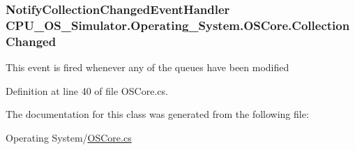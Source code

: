 \subsubsection[{Collection\+Changed}]{\setlength{\rightskip}{0pt plus 5cm}Notify\+Collection\+Changed\+Event\+Handler C\+P\+U\+\_\+\+O\+S\+\_\+\+Simulator.\+Operating\+\_\+\+System.\+O\+S\+Core.\+Collection\+Changed}\label{class_c_p_u___o_s___simulator_1_1_operating___system_1_1_o_s_core_abcbb2efff8a4078fae3edb9b31f62198}


This event is fired whenever any of the queues have been modified 



Definition at line 40 of file O\+S\+Core.\+cs.



The documentation for this class was generated from the following file\+:\begin{DoxyCompactItemize}
\item 
Operating System/\hyperlink{_o_s_core_8cs}{O\+S\+Core.\+cs}\end{DoxyCompactItemize}
